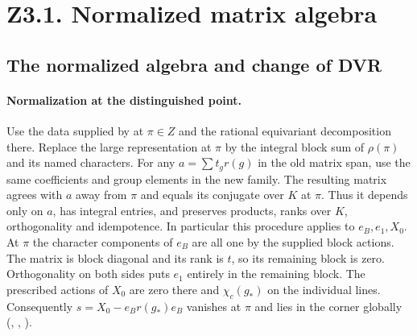 \section*{Z3.1. Normalized matrix algebra}

\subsection{The normalized algebra and change of DVR}\label{r6:normalized-ring}
\paragraph{Normalization at the distinguished point.}
Use the data supplied by  at $\pi\in Z$ and the rational
equivariant decomposition there. Replace the large representation at
$\pi$ by the integral block sum of $\rho(\pi)$ and its named characters.
For any $a=\sum t_g r(g)$ in the old matrix span, use the same coefficients
and group elements in the new family. The resulting matrix agrees with
$a$ away from $\pi$ and equals its conjugate over $K$ at $\pi$. Thus it
depends only on $a$, has integral entries, and preserves products, ranks
over $K$, orthogonality and idempotence. In particular this procedure
applies to $e_B,e_1,X_0$. At $\pi$ the character components of $e_B$
are all one by the supplied block actions. The matrix is block diagonal
and its rank is $t$, so its remaining block is zero. Orthogonality on
both sides puts $e_1$ entirely in the remaining block. The prescribed
actions of $X_0$ are zero there and $\chi_c(g_*)$ on the individual
lines. Consequently $s=X_0-e_Br(g_*)e_B$ vanishes at $\pi$ and lies
in the corner globally
(, ,
).


